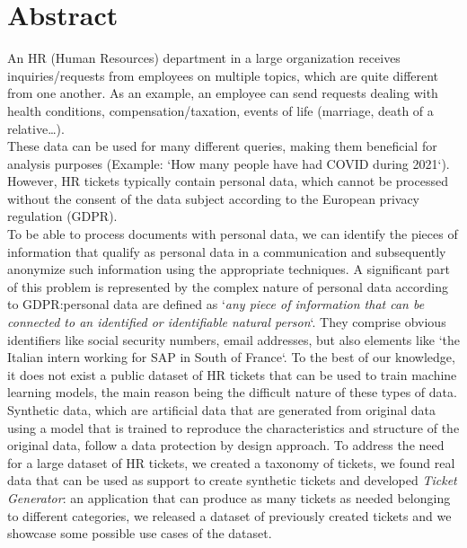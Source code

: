 \chapter*{Abstract}

An HR (Human Resources) department in a large organization receives inquiries\slash requests from employees on multiple topics, which are quite different from one another. As an example, an employee can send requests dealing with health conditions, compensation/taxation, events of life (marriage, death of a relative\dots). \\
These data can be used for many different queries, making them beneficial for analysis purposes (Example: `How many people have had COVID during 2021`). However, HR tickets typically contain personal data, which cannot be processed without the consent of the data subject according to the European privacy regulation (GDPR). \\
To be able to process documents with personal data, we can identify the pieces of information that qualify as personal data in a communication and subsequently anonymize such information using the appropriate techniques.
A significant part of this problem is represented by the complex nature of personal data according to GDPR:\@ personal data are defined as `\textit{any piece of information that can be connected to an identified or identifiable natural person}`. They comprise obvious identifiers like social security numbers, email addresses, but also elements like `the Italian intern working for SAP in South of France`.
To the best of our knowledge, it does not exist a public dataset of HR tickets that can be used to train machine learning models, the main reason being the difficult nature of these types of data. Synthetic data, which are artificial data that are generated from original data using a model that is trained to reproduce the characteristics and structure of the original data, follow a data protection by design approach.
To address the need for a large dataset of HR tickets, we created a taxonomy of tickets, we found real data that can be used as support to create synthetic tickets and developed \textit{Ticket Generator}: an application that can produce as many tickets as needed belonging to different categories, we released a dataset of previously created tickets and we showcase some possible use cases of the dataset.
